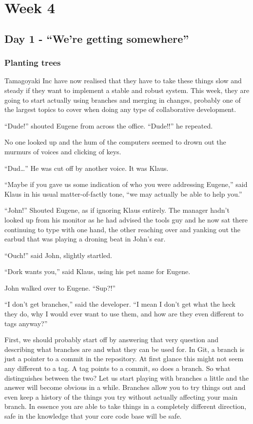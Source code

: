 \cleardoublepage
\chapter{Week 4}
\section{Day 1 - ``We're getting somewhere''}
\subsection{Planting trees}
Tamagoyaki Inc have now realised that they have to take these things slow and steady if they want to implement a stable and robust system.
This week, they are going to start actually using branches and merging in changes, probably one of the largest topics to cover when doing any type of collaborative development.

\begin{trenches}
``Dude!'' shouted Eugene from across the office.
``Dude!!'' he repeated.

No one looked up and the hum of the computers seemed to drown out the murmurs of voices and clicking of keys.

``Dud\ldots''
He was cut off by another voice.
It was Klaus.

``Maybe if you gave us some indication of who you were addressing Eugene,'' said Klaus in his usual matter-of-factly tone,
``we may actually be able to help you.''

``John!'' Shouted Eugene, as if ignoring Klaus entirely.
The manager hadn't looked up from his monitor as he had advised the tools guy and he now sat there continuing to type with one hand, the other reaching over and yanking out the earbud that was playing a droning beat in John's ear.

``Ouch!'' said John, slightly startled.

``Dork wants you,'' said Klaus, using his pet name for Eugene.

John walked over to Eugene.
``Sup?!''

``I don't get branches,'' said the developer.
``I mean I don't get what the heck they do, why I would ever want to use them, and how are they even different to tags anyway?''
\end{trenches}

First, we should probably start off by answering that very question and describing what branches are and what they can be used for.
In Git, a branch is just a pointer to a commit in the repository.
At first glance this might not seem any different to a tag.
A tag points to a commit, so does a branch.
So what distinguishes between the two? Let us start playing with branches a little and the answer will become obvious in a while.
Branches allow you to try things out and even keep a history of the things you try without actually affecting your main branch.
In essence you are able to take things in a completely different direction, safe in the knowledge that your core code base will be safe.

